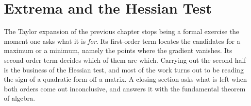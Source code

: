 \chapter{Extrema and the Hessian Test}
\label{ch:extrema}

The Taylor expansion of the previous chapter stops being a formal exercise the moment one asks
what it is \emph{for}. Its first-order term locates the candidates for a maximum or a minimum,
namely the points where the gradient vanishes. Its second-order term decides which of them are
which. Carrying out the second half is the business of the Hessian test, and most of the work
turns out to be reading the sign of a quadratic form off a matrix. A closing section asks what is
left when both orders come out inconclusive, and answers it with the fundamental theorem of
algebra.





